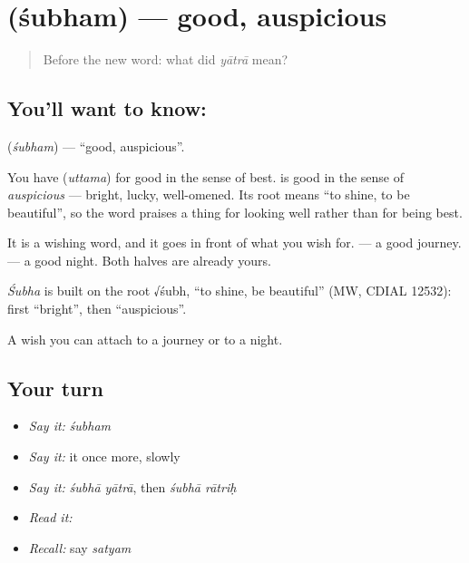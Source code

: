 \section[\texorpdfstring{\sk{शुभम्} (śubham)}{शुभम् (śubham)}]{ (śubham) — good, auspicious}

\label{lesson:SA-C28-auspicious}



\begin{quote}
Before the new word: what did \emph{yātrā} mean?
\end{quote}

\subsection*{You'll want to know: }
\textbf{} (\emph{śubham}) — \textquotedblleft{}good, auspicious\textquotedblright{}.

You have \textbf{} (\emph{uttama}) for good in the sense of best. \textbf{} is good in the sense of \emph{auspicious} — bright, lucky, well-omened. Its root means \textquotedblleft{}to shine, to be beautiful\textquotedblright{}, so the word praises a thing for looking well rather than for being best.

It is a wishing word, and it goes in front of what you wish for. \textbf{ } — a good journey. \textbf{ } — a good night. Both halves are already yours.

\begin{cousinweb}
\emph{Śubha} is built on the root √śubh, \textquotedblleft{}to shine, be beautiful\textquotedblright{} (MW, CDIAL 12532): first \textquotedblleft{}bright\textquotedblright{}, then \textquotedblleft{}auspicious\textquotedblright{}.
\end{cousinweb}

\begin{grammarlens}[title={What you've built}]
A wish you can attach to a journey or to a night.
\end{grammarlens}

\subsection*{Your turn}
\begin{itemize}
\raggedright
  \item \emph{Say it:} \emph{śubham}
  \item \emph{Say it:} it once more, slowly
  \item \emph{Say it:} \emph{śubhā yātrā}, then \emph{śubhā rātriḥ}
  \item \emph{Read it:} \textbf{}
  \item \emph{Recall:} say \emph{satyam}
\end{itemize}

